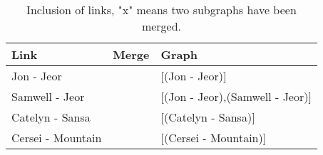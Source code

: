 \documentclass[10pt,a4paper]{article}
\begin{document}
\begin{enumerate}
\begin{table}[H]
	\centering
	\caption{Inclusion of links, "x" means two subgraphs have been merged.}
	\label{my-label}
	\begin{tabular}{|l|l|l|}
		\hline
		Link              & Merge & Graph                                                                                                                                                                                                                                                                                                                                                                                                                                                                                                \\ \hline
		Jon - Jeor        &       & {[}(Jon - Jeor){]}                                                                                                                                                                                                                                                                                                                                                                                                                                                                                   \\ \hline
		Samwell - Jeor    &       & {[}(Jon - Jeor),(Samwell - Jeor){]}                                                                                                                                                                                                                                                                                                                                                                                                                                                                  \\ \hline
		Catelyn - Sansa   &       & {[}(Catelyn - Sansa){]}                                                                                                                                                                                                                                                                                                                                                                                                                                                                              \\ \hline
		Cersei - Mountain &       & {[}(Cersei - Mountain){]}                                                                                                                                                                                                                                                                                                                                                                                                                                                                            \\ \hline

\end{tabular}
\end{table}
\end{enumerate}
\end{document}
